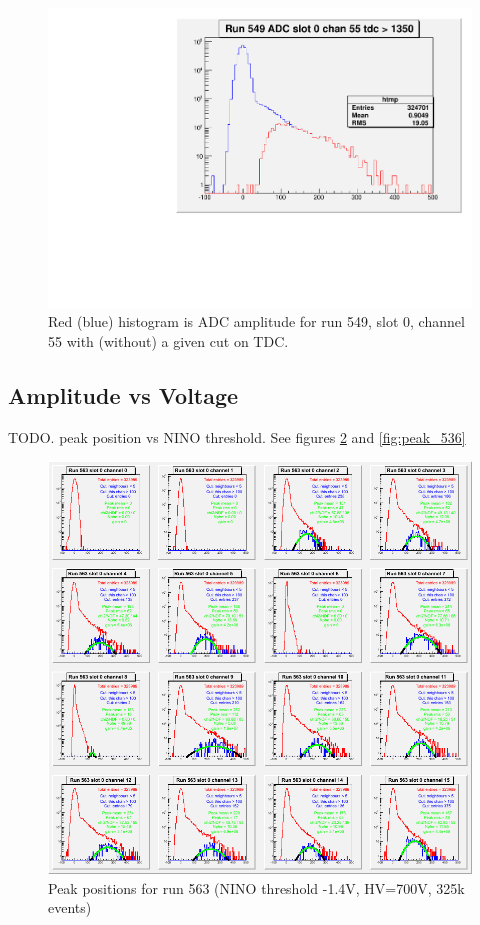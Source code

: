 \documentclass{article}
\begin{document}
\begin{figure}[htbp]
\includegraphics[width=\textwidth]{run_549_adc_55}
\caption{Red (blue) histogram is ADC amplitude for run 549, slot 0, channel 55 with (without) a given cut on TDC.}
\label{fig:eta_adc}
\end{figure}

\subsection{Amplitude vs Voltage}\label{sec:adcv}
TODO.
peak position vs NINO threshold.
See figures \ref{fig:peak_563} and \ref{fig:peak_536}

\begin{figure}[htbp]
\includegraphics[width=\textwidth]{run_563_peaks_slot_0_chans_0_15_lt_5_gt_100}
\caption{Peak positions for run 563 (NINO threshold -1.4V, HV=700V, 325k events)}
\label{fig:peak_563}
\end{figure}
\end{document}
